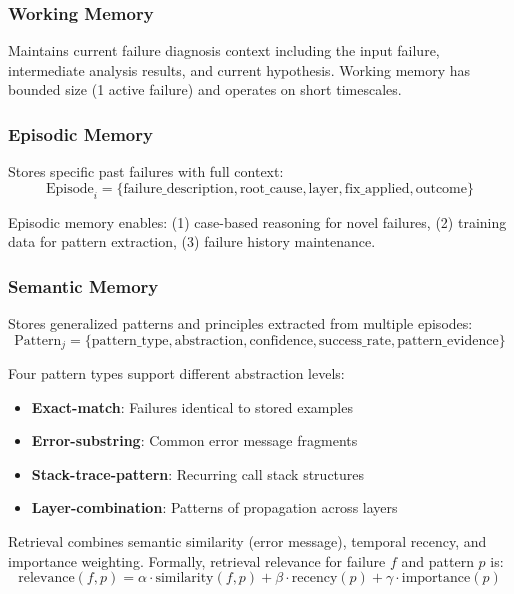 \documentclass[11pt]{article}
\begin{document}
\subsubsection{Working Memory}
Maintains current failure diagnosis context including the input failure, intermediate analysis results, and current hypothesis. Working memory has bounded size (1 active failure) and operates on short timescales.

\subsubsection{Episodic Memory}
Stores specific past failures with full context:
\begin{equation}
\text{Episode}_i = \{\text{failure\_description}, \text{root\_cause}, \text{layer}, \text{fix\_applied}, \text{outcome}\}
\end{equation}

Episodic memory enables: (1) case-based reasoning for novel failures, (2) training data for pattern extraction, (3) failure history maintenance.

\subsubsection{Semantic Memory}
Stores generalized patterns and principles extracted from multiple episodes:
\begin{equation}
\text{Pattern}_j = \{\text{pattern\_type}, \text{abstraction}, \text{confidence}, \text{success\_rate}, \text{pattern\_evidence}\}
\end{equation}

Four pattern types support different abstraction levels:
\begin{itemize}
    \item \textbf{Exact-match}: Failures identical to stored examples
    \item \textbf{Error-substring}: Common error message fragments
    \item \textbf{Stack-trace-pattern}: Recurring call stack structures
    \item \textbf{Layer-combination}: Patterns of propagation across layers
\end{itemize}

Retrieval combines semantic similarity (error message), temporal recency, and importance weighting. Formally, retrieval relevance for failure $f$ and pattern $p$ is:
\begin{equation}
\text{relevance}(f, p) = \alpha \cdot \text{similarity}(f, p) + \beta \cdot \text{recency}(p) + \gamma \cdot \text{importance}(p)
\end{equation}
\end{document}
